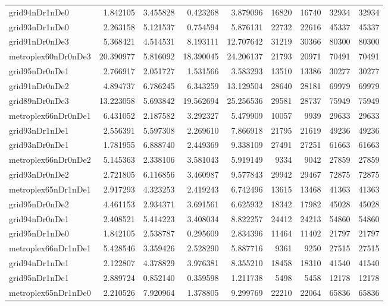 \begin{longtable}{|l|r|r|r|r|r|r|r|r|}
grid94nDr1nDe0 & 1.842105 & 3.455828 & 0.423268 & 3.879096 & 16820 & 16740 & 32934 & 32934 \\
grid93nDr1nDe0 & 2.263158 & 5.121537 & 0.754594 & 5.876131 & 22732 & 22616 & 45337 & 45337 \\
grid91nDr0nDe3 & 5.368421 & 4.514531 & 8.193111 & 12.707642 & 31219 & 30366 & 80300 & 80300 \\
metroplex60nDr0nDe3 & 20.390977 & 5.816092 & 18.390045 & 24.206137 & 21793 & 20971 & 70491 & 70491 \\
grid95nDr0nDe1 & 2.766917 & 2.051727 & 1.531566 & 3.583293 & 13510 & 13386 & 30277 & 30277 \\
grid91nDr0nDe2 & 4.894737 & 6.786245 & 6.343259 & 13.129504 & 28640 & 28181 & 69979 & 69979 \\
grid89nDr0nDe3 & 13.223058 & 5.693842 & 19.562694 & 25.256536 & 29581 & 28737 & 75949 & 75949 \\
metroplex66nDr0nDe1 & 6.431052 & 2.187582 & 3.292327 & 5.479909 & 10057 & 9939 & 29633 & 29633 \\
grid93nDr1nDe1 & 2.556391 & 5.597308 & 2.269610 & 7.866918 & 21795 & 21619 & 49236 & 49236 \\
grid93nDr0nDe1 & 1.781955 & 6.888740 & 2.449369 & 9.338109 & 27491 & 27251 & 61663 & 61663 \\
metroplex66nDr0nDe2 & 5.145363 & 2.338106 & 3.581043 & 5.919149 & 9334 & 9042 & 27859 & 27859 \\
grid93nDr0nDe2 & 2.721805 & 6.116856 & 3.460987 & 9.577843 & 29942 & 29467 & 72875 & 72875 \\
metroplex65nDr1nDe1 & 2.917293 & 4.323253 & 2.419243 & 6.742496 & 13615 & 13468 & 41363 & 41363 \\
grid95nDr0nDe2 & 4.461153 & 2.934371 & 3.691561 & 6.625932 & 18342 & 17982 & 45028 & 45028 \\
grid94nDr0nDe1 & 2.408521 & 5.414223 & 3.408034 & 8.822257 & 24412 & 24213 & 54860 & 54860 \\
grid95nDr1nDe0 & 1.842105 & 2.538787 & 0.295609 & 2.834396 & 11464 & 11402 & 21797 & 21797 \\
metroplex66nDr1nDe1 & 5.428546 & 3.359426 & 2.528290 & 5.887716 & 9361 & 9250 & 27515 & 27515 \\
grid94nDr1nDe1 & 2.122807 & 4.378829 & 3.976381 & 8.355210 & 18458 & 18310 & 41540 & 41540 \\
grid95nDr1nDe1 & 2.889724 & 0.852140 & 0.359598 & 1.211738 & 5498 & 5458 & 12178 & 12178 \\
metroplex65nDr1nDe0 & 2.210526 & 7.920964 & 1.378805 & 9.299769 & 22210 & 22064 & 65836 & 65836 \\

\end{longtable}
